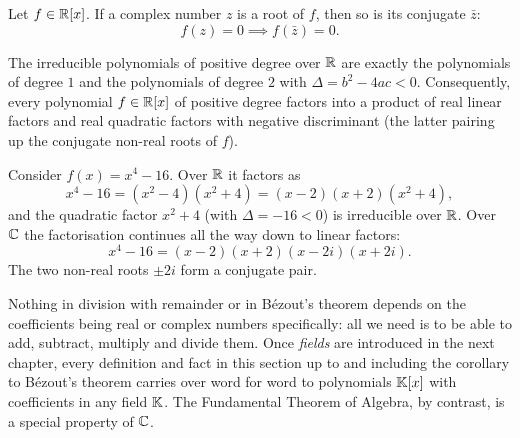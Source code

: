 \begin{theorem}
Let $f\in \mathbb{R}[x]$. If a complex number $z$ is a root of $f$, then so is its conjugate $\bar z$:
\[
f(z)=0 \implies f(\bar{z})=0.
\]
\end{theorem}

\begin{corollary}
The irreducible polynomials of positive degree over $\mathbb{R}$ are exactly the polynomials of degree $1$ and the
polynomials of degree $2$ with $\Delta = b^2-4ac<0$. Consequently, every polynomial $f\in\mathbb{R}[x]$ of positive
degree factors into a product of real linear factors and real quadratic factors with negative discriminant
(the latter pairing up the conjugate non-real roots of $f$).
\end{corollary}

\begin{example}
Consider $f(x) = x^4-16$. Over $\mathbb{R}$ it factors as
\[
x^4-16 = (x^2-4)(x^2+4) = (x-2)(x+2)(x^2+4),
\]
and the quadratic factor $x^2+4$ (with $\Delta = -16<0$) is irreducible over $\mathbb{R}$. Over $\mathbb{C}$ the
factorisation continues all the way down to linear factors:
\[
x^4-16 = (x-2)(x+2)(x-2i)(x+2i).
\]
The two non-real roots $\pm 2i$ form a conjugate pair.
\end{example}

\begin{remark}
Nothing in division with remainder or in Bézout's theorem depends on the coefficients being real or complex
numbers specifically: all we need is to be able to add, subtract, multiply and divide them. Once
\emph{fields} are introduced in the next chapter, every definition and fact in this section up to and
including the corollary to Bézout's theorem carries over word for word to polynomials $\mathbb{K}[x]$ with
coefficients in any field $\mathbb{K}$. The Fundamental Theorem of Algebra, by contrast, is a special property of
$\mathbb{C}$.
\end{remark}
